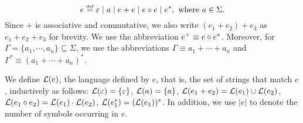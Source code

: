 \begin{definition}
	\[e \eqdef \varepsilon \mid a \mid e + e \mid e \concat e \mid e^*, \mbox{ where } a \in \Sigma. \]
	Since $+$ is associative and commutative, we also write $(e_1 + e_2) + e_3$ as $e_1 + e_2 + e_3$ for brevity. We use the abbreviation $e^+ \equiv e \circ e^*$. Moreover, for $\Gamma = \{a_1, \cdots, a_n\}\subseteq \Sigma$, we use the abbreviations $\Gamma \equiv a_1 + \cdots + a_n$ and $\Gamma^\ast \equiv (a_1 + \cdots + a_n)^\ast$. 
\end{definition}
We define $\mathcal{L}(e)$, the language defined by $e$, that is, the set of strings that match $e$, inductively as follows: 
$\mathcal{L}(\varepsilon) =\{\varepsilon\}$,
%
$\mathcal{L}(a)= \{a\}$,
%
$\mathcal{L}(e_1 + e_2) = \mathcal{L}(e_1) \cup \mathcal{L}(e_2)$,
%
$\mathcal{L}(e_1 \circ e_2) = \mathcal{L}(e_1) \cdot \mathcal{L}(e_2)$,
%
$\mathcal{L}(e_1^*)=(\mathcal{L}(e_1))^*$.
In addition, we use $|e|$ to denote the number of symbols occurring in $e$.

